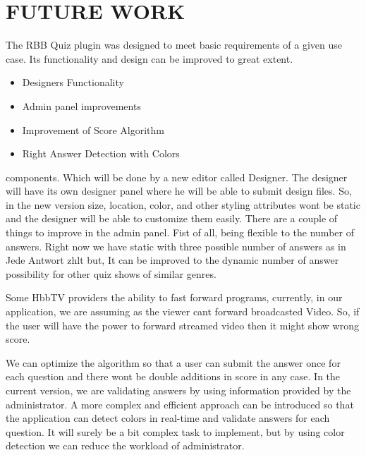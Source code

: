 \section{\textbf{FUTURE WORK}}\label{sec:FUTURE WORK} 
The RBB Quiz plugin was designed to meet basic requirements
of a given use case. Its functionality and design can be
improved to great extent.

\begin{itemize}
 
\item Designers Functionality
\item  Admin panel improvements
\item  Improvement of Score Algorithm
\item  Right Answer Detection with Colors
 
\end{itemize}

components. Which will be done by a new editor
called Designer. The designer will have its own designer panel
where he will be able to submit design files. So, in the new
version size, location, color, and other styling attributes wont
be static and the designer will be able to customize them easily.
There are a couple of things to improve in the admin panel.
Fist of all, being flexible to the number of answers. Right
now we have static with three possible number of answers as
in Jede Antwort zhlt but, It can be improved to the dynamic
number of answer possibility for other quiz shows of similar
genres.

Some HbbTV providers the ability to fast forward programs,
currently, in our application, we are assuming as the viewer
cant forward broadcasted Video. So, if the user will have the
power to forward streamed video then it might show wrong
score.


We can optimize the algorithm so that a user can submit
the answer once for each question and there wont be double
additions in score in any case.
In the current version, we are validating answers by using
information provided by the administrator. A more complex
and efficient approach can be introduced so that the application
can detect colors in real-time and validate answers for each
question. It will surely be a bit complex task to implement,
but by using color detection we can reduce the workload of
administrator.



 